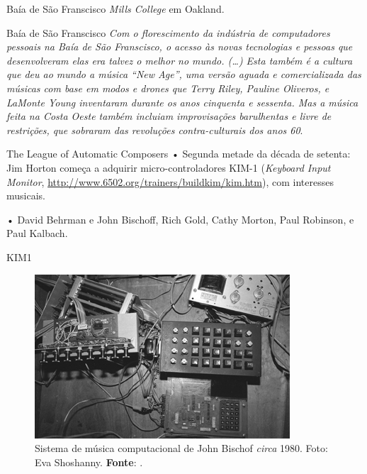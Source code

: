 \documentclass[aspectratio=169]{beamer}
\begin{document}
\begin{frame}{Baía de São Franscisco}
\emph{Mills College} em Oakland. 
\end{frame}

\begin{frame}{Baía de São Franscisco}
\emph{Com o florescimento da indústria de computadores pessoais na Baía de São Franscisco, o acesso às novas tecnologias e pessoas que desenvolveram elas era talvez o melhor no mundo. (\ldots) Esta também é a cultura que deu ao mundo a música ``New Age'', uma versão aguada e comercializada das músicas com base em modos e drones que Terry Riley, Pauline Oliveros, e LaMonte Young inventaram durante os anos cinquenta e sessenta. Mas a música feita na Costa Oeste também incluiam improvisações barulhentas e livre de restrições, que sobraram das revoluções contra-culturais dos anos 60}\cite{brown_indigenous_2013}.
\end{frame}

\begin{frame}{The League of Automatic Composers}
• Segunda metade da década de setenta: Jim Horton começa a adquirir micro-controladores KIM-1 (\emph{Keyboard Input Monitor}, \url{http://www.6502.org/trainers/buildkim/kim.htm}), com interesses musicais. 

• David Behrman e John Bischoff, Rich Gold, Cathy Morton, Paul Robinson, e Paul Kalbach.
\end{frame}

\begin{frame}{KIM1}
\begin{figure}[!h]
  \centering
  \includegraphics[scale=0.7]{imagens/siskim1.jpg}
  \caption{Sistema de música computacional de John Bischof \emph{circa} 1980. Foto: Eva Shoshanny\protect\footnotemark. \textbf{Fonte}: .}
  \label{fig:siskim1}
\end{figure}
\end{frame}
\end{document}

